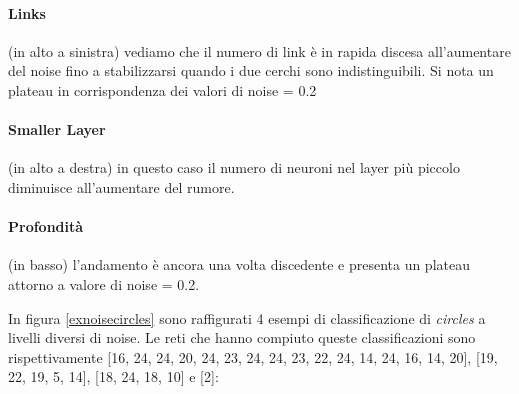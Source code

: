\documentclass[12pt,a4paper]{report}
\begin{document}
\paragraph{Links} (in alto a sinistra) vediamo che il numero di link è in rapida discesa all'aumentare del noise fino a stabilizzarsi quando i due cerchi sono indistinguibili. Si nota un plateau in corrispondenza dei valori di noise = 0.2 

\paragraph{Smaller Layer} (in alto a destra) in questo caso il numero di neuroni nel layer più piccolo diminuisce all'aumentare del rumore.

\paragraph{Profondità} (in basso) l'andamento è ancora una volta discedente e presenta un plateau attorno a valore di noise = 0.2.

In figura \ref{exnoisecircles} sono raffigurati 4 esempi di classificazione di \textit{circles} a livelli diversi di noise. Le reti che hanno compiuto queste classificazioni sono rispettivamente [16, 24, 24, 20, 24, 23, 24, 24, 23, 22, 24, 14, 24, 16, 14, 20], [19, 22, 19, 5, 14], [18, 24, 18, 10] e [2]:
\end{document}
